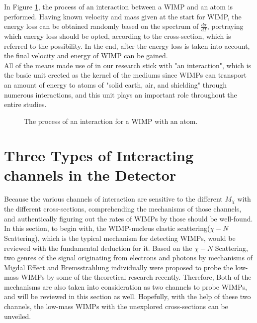 In Figure \ref{Interaction}, the process of an interaction between a WIMP and an atom is performed. Having known velocity and mass given at the start for WIMP, the energy loss can be obtained randomly based on the spectrum of $\frac{d\sigma}{dT}$, portraying which energy loss should be opted, according to the cross-section, which is referred to the possibility. In the end, after the energy loss is taken into account, the final velocity and energy of WIMP can be gained.\\

All of the means made use of in our research stick with "an interaction", which is the basic unit erected as the kernel of the mediums since WIMPs can transport an amount of energy to atoms of "solid earth, air, and shielding" through numerous interactions, and this unit plays an important role throughout the entire studies. \\

\begin{figure}
\begin{center}
\end{center}
\caption{The process of an interaction for a WIMP with an atom.} \label{Interaction}
\end{figure}


\section{Three Types of Interacting channels in the Detector}
Because the various channels of interaction are sensitive to the different $M_{\chi}$ with the different cross-sections, comprehending the mechanisms of those channels, and authentically figuring out the rates of WIMPs by those should be well-found. In this section, to begin with, the WIMP-nucleus elastic scattering($\chi-N$ Scattering), which is the typical mechanism for detecting WIMPs, would be reviewed with the fundamental deduction for it. Based on the $\chi-N$ Scattering, two genres of the signal originating from electrons and photons by mechanisms of Migdal Effect and Bremsstrahlung individually were proposed to probe the low-mass WIMPs by some of the theoretical research recently. Therefore, Both of the mechanisms are also taken into consideration as two channels to probe WIMPs, and will be reviewed in this section as well. Hopefully, with the help of these two channels, the low-mass WIMPs with the unexplored cross-sections can be unveiled.

